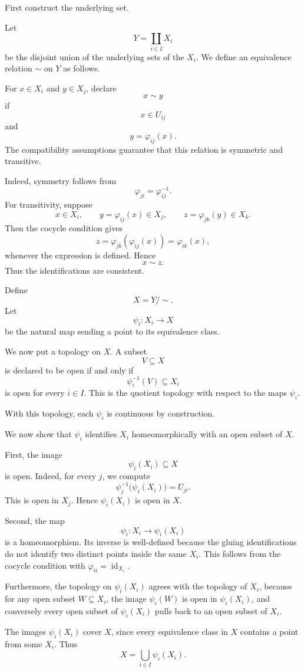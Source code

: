 First construct the underlying set.

Let
\[
Y=\coprod_{i\in I}X_i
\]
be the disjoint union of the underlying sets of the \(X_i\). We define an equivalence relation \(\sim\) on \(Y\) as follows.

For \(x\in X_i\) and \(y\in X_j\), declare
\[
x\sim y
\]
if
\[
x\in U_{ij}
\]
and
\[
y=\varphi_{ij}(x).
\]
The compatibility assumptions guarantee that this relation is symmetric and transitive.

Indeed, symmetry follows from
\[
\varphi_{ji}=\varphi_{ij}^{-1}.
\]
For transitivity, suppose
\[
x\in X_i,
\qquad
y=\varphi_{ij}(x)\in X_j,
\qquad
z=\varphi_{jk}(y)\in X_k.
\]
Then the cocycle condition gives
\[
z
=
\varphi_{jk}(\varphi_{ij}(x))
=
\varphi_{ik}(x),
\]
whenever the expression is defined. Hence
\[
x\sim z.
\]
Thus the identifications are consistent.

Define
\[
X=Y/{\sim}.
\]
Let
\[
\psi_i:X_i\to X
\]
be the natural map sending a point to its equivalence class.

We now put a topology on \(X\). A subset
\[
V\subseteq X
\]
is declared to be open if and only if
\[
\psi_i^{-1}(V)\subseteq X_i
\]
is open for every \(i\in I\). This is the quotient topology with respect to the maps \(\psi_i\).

With this topology, each \(\psi_i\) is continuous by construction.

We now show that \(\psi_i\) identifies \(X_i\) homeomorphically with an open subset of \(X\).

First, the image
\[
\psi_i(X_i)\subseteq X
\]
is open. Indeed, for every \(j\), we compute
\[
\psi_j^{-1}\bigl(\psi_i(X_i)\bigr)=U_{ji}.
\]
This is open in \(X_j\). Hence \(\psi_i(X_i)\) is open in \(X\).

Second, the map
\[
\psi_i:X_i\to \psi_i(X_i)
\]
is a homeomorphism. Its inverse is well-defined because the gluing identifications do not identify two distinct points inside the same \(X_i\). This follows from the cocycle condition with \(\varphi_{ii}=\operatorname{id}_{X_i}\).

Furthermore, the topology on \(\psi_i(X_i)\) agrees with the topology of \(X_i\), because for any open subset \(W\subseteq X_i\), the image \(\psi_i(W)\) is open in \(\psi_i(X_i)\), and conversely every open subset of \(\psi_i(X_i)\) pulls back to an open subset of \(X_i\).

The images \(\psi_i(X_i)\) cover \(X\), since every equivalence class in \(X\) contains a point from some \(X_i\). Thus
\[
X=\bigcup_{i\in I}\psi_i(X_i).
\]

